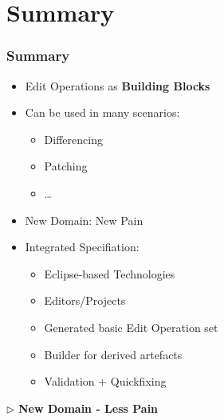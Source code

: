 \section{Summary}
\begin{frame}
  \frametitle{Summary}  
  \begin{itemize}
    \item Edit Operations as \textbf{Building Blocks}
    \item Can be used in many scenarios:
    \begin{itemize}
      \item Differencing
      \item Patching
      \item \ldots
      \end{itemize}
      \item New Domain: New Pain
    \item Integrated Specifiation:
    \begin{itemize}
      \item Eclipse-based Technologies
      \item Editors/Projects
      \item Generated basic Edit Operation set
      \item Builder for derived artefacts
      \item Validation + Quickfixing
      \end{itemize}
  \end{itemize}
  \centering
 $\triangleright$ \textbf{New Domain - Less Pain}
  \end{frame}
